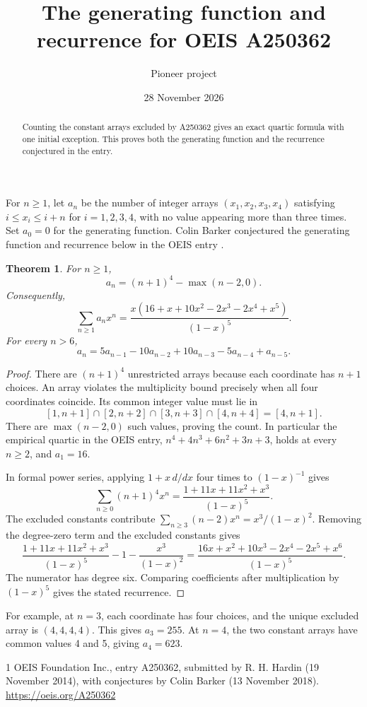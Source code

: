 \documentclass[11pt]{article}
\title{The generating function and recurrence for OEIS A250362}
\author{Pioneer project}
\date{28 November 2026}
\newtheorem{theorem}{Theorem}
\begin{document}
\maketitle

\begin{abstract}
Counting the constant arrays excluded by A250362 gives an exact quartic formula with one initial exception. This proves both the generating function and the recurrence conjectured in the entry.
\end{abstract}

For \(n\ge 1\), let \(a_n\) be the number of integer arrays \((x_1,x_2,x_3,x_4)\) satisfying \(i\le x_i\le i+n\) for \(i=1,2,3,4\), with no value appearing more than three times. Set \(a_0=0\) for the generating function. Colin Barker conjectured the generating function and recurrence below in the OEIS entry \cite{oeis}.

\begin{theorem}
For \(n\ge 1\),
\[
a_n=(n+1)^4-\max(n-2,0).
\]
Consequently,
\[
\sum_{n\ge 1}a_n x^n
=\frac{x(16+x+10x^2-2x^3-2x^4+x^5)}{(1-x)^5}.
\]
For every \(n>6\),
\[
a_n=5a_{n-1}-10a_{n-2}+10a_{n-3}-5a_{n-4}+a_{n-5}.
\]
\end{theorem}

\begin{proof}
There are \((n+1)^4\) unrestricted arrays because each coordinate has \(n+1\) choices. An array violates the multiplicity bound precisely when all four coordinates coincide. Its common integer value must lie in
\[
[1,n+1]\cap[2,n+2]\cap[3,n+3]\cap[4,n+4]=[4,n+1].
\]
There are \(\max(n-2,0)\) such values, proving the count. In particular the empirical quartic in the OEIS entry, \(n^4+4n^3+6n^2+3n+3\), holds at every \(n\ge2\), and \(a_1=16\).

In formal power series, applying \(1+x\,d/dx\) four times to \((1-x)^{-1}\) gives
\[
\sum_{n\ge0}(n+1)^4x^n=\frac{1+11x+11x^2+x^3}{(1-x)^5}.
\]
The excluded constants contribute \(\sum_{n\ge3}(n-2)x^n=x^3/(1-x)^2\). Removing the degree-zero term and the excluded constants gives
\[
\frac{1+11x+11x^2+x^3}{(1-x)^5}-1-\frac{x^3}{(1-x)^2}
=\frac{16x+x^2+10x^3-2x^4-2x^5+x^6}{(1-x)^5}.
\]
The numerator has degree six. Comparing coefficients after multiplication by \((1-x)^5\) gives the stated recurrence.
\end{proof}

For example, at \(n=3\), each coordinate has four choices, and the unique excluded array is \((4,4,4,4)\). This gives \(a_3=255\). At \(n=4\), the two constant arrays have common values 4 and 5, giving \(a_4=623\).

\begin{thebibliography}{1}
OEIS Foundation Inc., entry A250362, submitted by R. H. Hardin (19 November 2014), with conjectures by Colin Barker (13 November 2018).
\url{https://oeis.org/A250362}
\end{thebibliography}
\end{document}
